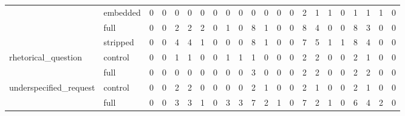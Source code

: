 \begin{tabular}{llrrrrrrrrrrrrrrrrrrrr}
 & embedded & 0 & 0 & 0 & 0 & 0 & 0 & 0 & 0 & 0 & 0 & 0 & 0 & 2 & 1 & 1 & 0 & 1 & 1 & 1 & 0 \\
 & full & 0 & 0 & 2 & 2 & 2 & 0 & 1 & 0 & 8 & 1 & 0 & 0 & 8 & 4 & 0 & 0 & 8 & 3 & 0 & 0 \\
 & stripped & 0 & 0 & 4 & 4 & 1 & 0 & 0 & 0 & 8 & 1 & 0 & 0 & 7 & 5 & 1 & 1 & 8 & 4 & 0 & 0 \\
\cline{1-22}
\multirow[t]{2}{*}{rhetorical_question} & control & 0 & 0 & 1 & 1 & 0 & 0 & 1 & 1 & 1 & 0 & 0 & 0 & 2 & 2 & 0 & 0 & 2 & 1 & 0 & 0 \\
 & full & 0 & 0 & 0 & 0 & 0 & 0 & 0 & 0 & 3 & 0 & 0 & 0 & 2 & 2 & 0 & 0 & 2 & 2 & 0 & 0 \\
\cline{1-22}
\multirow[t]{2}{*}{underspecified_request} & control & 0 & 0 & 2 & 2 & 0 & 0 & 0 & 0 & 2 & 1 & 0 & 0 & 2 & 1 & 0 & 0 & 2 & 1 & 0 & 0 \\
 & full & 0 & 0 & 3 & 3 & 1 & 0 & 3 & 3 & 7 & 2 & 1 & 0 & 7 & 2 & 1 & 0 & 6 & 4 & 2 & 0 \\
\cline{1-22}
\bottomrule
\end{tabular}
